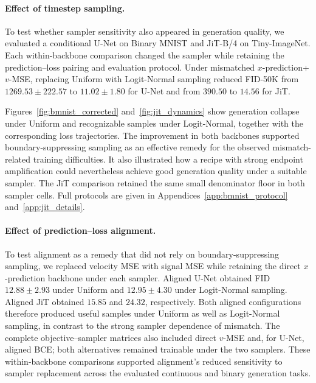 \documentclass{article}
\theoremstyle{plain}
\theoremstyle{definition}
\theoremstyle{remark}
\begin{document}
\paragraph{Effect of timestep sampling.}
To test whether sampler sensitivity also appeared in generation quality, we evaluated a conditional U-Net \citep{ronneberger2015unet} on Binary MNIST \citep{lecunmnist} and JiT-B/4 \citep{li2025back} on Tiny-ImageNet. Each within-backbone comparison changed the sampler while retaining the prediction--loss pairing and evaluation protocol. Under mismatched $x$-prediction+$v$-MSE, replacing Uniform with Logit-Normal sampling reduced FID-50K \citep{heusel2017gans} from $1269.53\pm222.57$ to $11.02\pm1.80$ for U-Net and from $390.50$ to $14.56$ for JiT.

Figures~\ref{fig:bmnist_corrected} and~\ref{fig:jit_dynamics} show generation collapse under Uniform and recognizable samples under Logit-Normal, together with the corresponding loss trajectories. The improvement in both backbones supported boundary-suppressing sampling as an effective remedy for the observed mismatch-related training difficulties. It also illustrated how a recipe with strong endpoint amplification could nevertheless achieve good generation quality under a suitable sampler. The JiT comparison retained the same small denominator floor in both sampler cells. Full protocols are given in Appendices~\ref{app:bmnist_protocol} and~\ref{app:jit_details}.



\paragraph{Effect of prediction--loss alignment.}
To test alignment as a remedy that did not rely on boundary-suppressing sampling, we replaced velocity MSE with signal MSE while retaining the direct $x$-prediction backbone under each sampler. Aligned U-Net obtained FID $12.88\pm2.93$ under Uniform and $12.95\pm4.30$ under Logit-Normal sampling. Aligned JiT obtained $15.85$ and $24.32$, respectively. Both aligned configurations therefore produced useful samples under Uniform as well as Logit-Normal sampling, in contrast to the strong sampler dependence of mismatch. The complete objective--sampler matrices also included direct $v$-MSE and, for U-Net, aligned BCE; both alternatives remained trainable under the two samplers. These within-backbone comparisons supported alignment's reduced sensitivity to sampler replacement across the evaluated continuous and binary generation tasks.
\end{document}
